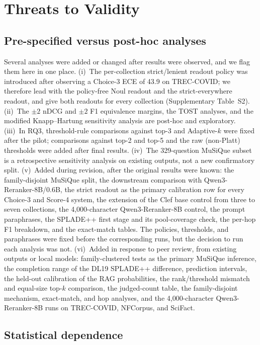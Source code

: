 \section{Threats to Validity}

\subsection{Pre-specified versus post-hoc analyses}

Several analyses were added or changed after results were observed, and we flag them here in one place. (i)~The per-collection strict/lenient readout policy was introduced after observing a Choice-3 ECE of 43.9 on TREC-COVID; we therefore lead with the policy-free Noul readout and the strict-everywhere readout, and give both readouts for every collection (Supplementary Table~S2). (ii)~The $\pm2$ nDCG and $\pm2$ F1 equivalence margins, the TOST analyses, and the modified Knapp--Hartung sensitivity analysis are post-hoc and exploratory. (iii)~In RQ3, threshold-rule comparisons against top-3 and Adaptive-$k$ were fixed after the pilot; comparisons against top-2 and top-5 and the raw (non-Platt) thresholds were added after final results. (iv)~The 329-question MuSiQue subset is a retrospective sensitivity analysis on existing outputs, not a new confirmatory split. (v)~Added during revision, after the original results were known: the family-disjoint MuSiQue split, the downstream comparison with Qwen3-Reranker-8B/0.6B, the strict readout as the primary calibration row for every Choice-3 and Score-4 system, the extension of the Clef base control from three to seven collections, the 4{,}000-character Qwen3-Reranker-8B control, the prompt paraphrases, the SPLADE++ first stage and its pool-coverage check, the per-hop F1 breakdown, and the exact-match tables. The policies, thresholds, and paraphrases were fixed before the corresponding runs, but the decision to run each analysis was not. (vi)~Added in response to peer review, from existing outputs or local models: family-clustered tests as the primary MuSiQue inference, the completion range of the DL19 SPLADE++ difference, prediction intervals, the held-out calibration of the RAG probabilities, the rank/threshold mismatch and equal-size top-$k$ comparison, the judged-count table, the family-disjoint mechanism, exact-match, and hop analyses, and the 4{,}000-character Qwen3-Reranker-8B runs on TREC-COVID, NFCorpus, and SciFact.

\subsection{Statistical dependence}

